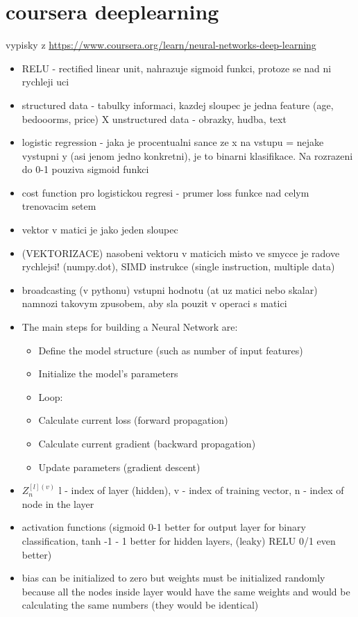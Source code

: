 \section{coursera deeplearning}
vypisky z \url{https://www.coursera.org/learn/neural-networks-deep-learning}
\begin{itemize}
  \item RELU - rectified linear unit, nahrazuje sigmoid funkci, protoze se nad ni rychleji uci
  \item structured data - tabulky informaci, kazdej sloupec je jedna feature (age, bedooorms, price) X unstructured data - obrazky, hudba, text
  \item logistic regression - jaka je procentualni sance ze x na vstupu = nejake vystupni y (asi jenom jedno konkretni), je to binarni klasifikace. Na rozrazeni do 0-1 pouziva sigmoid funkci
  \item cost function pro logistickou regresi - prumer loss funkce nad celym trenovacim setem
  \item vektor v matici je jako jeden sloupec
  \item (VEKTORIZACE) nasobeni vektoru v maticich misto ve smycce je radove rychlejsi! (numpy.dot), SIMD instrukce (single instruction, multiple data)
  \item broadcasting (v pythonu) vstupni hodnotu (at uz matici nebo skalar) namnozi takovym zpusobem, aby sla pouzit v operaci s matici
  \item The main steps for building a Neural Network are:
  \begin{itemize}
    \item Define the model structure (such as number of input features)
    \item Initialize the model's parameters
    \item Loop:
    \item Calculate current loss (forward propagation)
    \item Calculate current gradient (backward propagation)
    \item Update parameters (gradient descent)
  \end{itemize}
  \item $Z_{n}^{[l](v)}$ l - index of layer (hidden), v - index of training vector, n - index of node in the layer
  \item activation functions (sigmoid 0-1 better for output layer for binary classification, tanh -1 - 1 better for hidden layers, (leaky) RELU 0/1 even better)
  \item bias can be initialized to zero but weights must be initialized randomly because all the nodes inside layer would have the same weights and would be calculating the same numbers (they would be identical)
\end{itemize}

